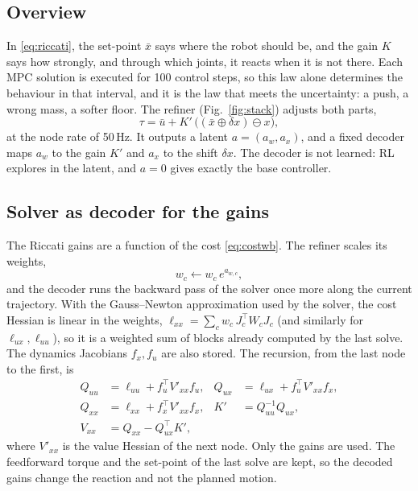\documentclass[conference]{IEEEtran}
\newcommand{\T}{^{\top}}
\newcommand{\xb}{\bar{x}}
\newcommand{\ub}{\bar{u}}
\begin{document}
\subsection{Overview}
In \eqref{eq:riccati}, the set-point $\xb$ says where the robot should be, and the gain $K$ says how strongly, and through which joints, it reacts when it is not there.
Each MPC solution is executed for 100 control steps, so this law alone determines the behaviour in that interval, and it is the law that meets the uncertainty: a push, a wrong mass, a softer floor.
The refiner (Fig.~\ref{fig:stack}) adjusts both parts,
\begin{equation}
\tau=\ub+K'\,\big((\xb\oplus\delta x)\ominus x\big),
\label{eq:refined}
\end{equation}
at the node rate of 50\,Hz.
It outputs a latent $a=(a_w,a_x)$, and a fixed decoder maps $a_w$ to the gain $K'$ and $a_x$ to the shift $\delta x$.
The decoder is not learned: RL explores in the latent, and $a=0$ gives exactly the base controller.

\subsection{Solver as decoder for the gains}
The Riccati gains are a function of the cost \eqref{eq:costwb}.
The refiner scales its weights,
\begin{equation}
w_c\leftarrow w_c\,e^{a_{w,c}},
\label{eq:scale}
\end{equation}
and the decoder runs the backward pass of the solver once more along the current trajectory.
With the Gauss--Newton approximation used by the solver, the cost Hessian is linear in the weights, $\ell_{xx}=\sum_c w_c\,J_c\T W_cJ_c$ (and similarly for $\ell_{ux},\ell_{uu}$), so it is a weighted sum of blocks already computed by the last solve.
The dynamics Jacobians $f_x,f_u$ are also stored.
The recursion, from the last node to the first, is
\begin{align}
Q_{uu}&=\ell_{uu}+f_u\T V'_{xx}f_u, &Q_{ux}&=\ell_{ux}+f_u\T V'_{xx}f_x,\nonumber\\
Q_{xx}&=\ell_{xx}+f_x\T V'_{xx}f_x, &K'&=Q_{uu}^{-1}Q_{ux},\nonumber\\
V_{xx}&=Q_{xx}-Q_{ux}\T K', &&
\label{eq:backward}
\end{align}
where $V'_{xx}$ is the value Hessian of the next node.
Only the gains are used.
The feedforward torque and the set-point of the last solve are kept, so the decoded gains change the reaction and not the planned motion.
\end{document}
